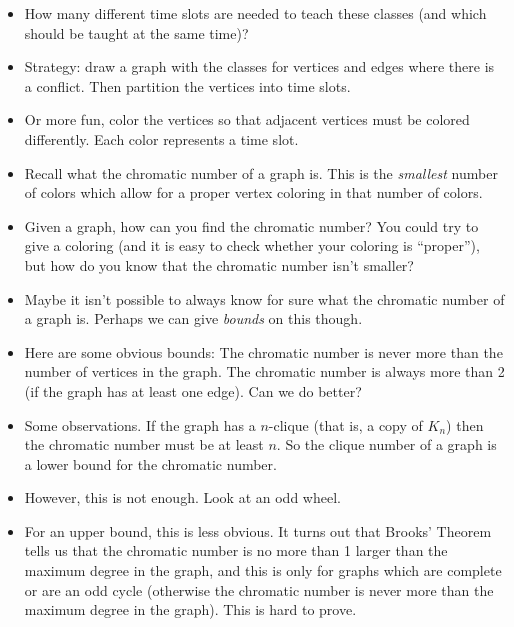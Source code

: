 \documentclass[12pt]{article}
\theoremstyle{plain}
\theoremstyle{definition}
\theoremstyle{remark}
\begin{document}
\begin{itemize}
     \item How many different time slots are needed to teach these classes (and which should be taught at the same time)?

     \item Strategy: draw a graph with the classes for vertices and edges where there is a conflict.  Then partition the vertices into time slots.

     \item Or more fun, color the vertices so that adjacent vertices must be colored differently.  Each color represents a time slot.

     \item Recall what the chromatic number of a graph is.  This is the \emph{smallest} number of colors which allow for a proper vertex coloring in that number of colors.

     \item Given a graph, how can you find the chromatic number?  You could try to give a coloring (and it is easy to check whether your coloring is ``proper''), but how do you know that the chromatic number isn't smaller?

     \item Maybe it isn't possible to always know for sure what the chromatic number of a graph is.  Perhaps we can give \emph{bounds} on this though.

     \item Here are some obvious bounds: The chromatic number is never more than the number of vertices in the graph.  The chromatic number is always more than 2 (if the graph has at least one edge).  Can we do better?


     \item Some observations.  If the graph has a $n$-clique (that is, a copy of $K_n$) then the chromatic number must be at least $n$.  So the clique number of a graph is a lower bound for the chromatic number.

     \item However, this is not enough.  Look at an odd wheel.

     \item For an upper bound, this is less obvious.  It turns out that Brooks' Theorem tells us that the chromatic number is no more than 1 larger than the maximum degree in the graph, and this is only for graphs which are complete or are an odd cycle (otherwise the chromatic number is never more than the maximum degree in the graph).  This is hard to prove.


\end{itemize}
\end{document}
